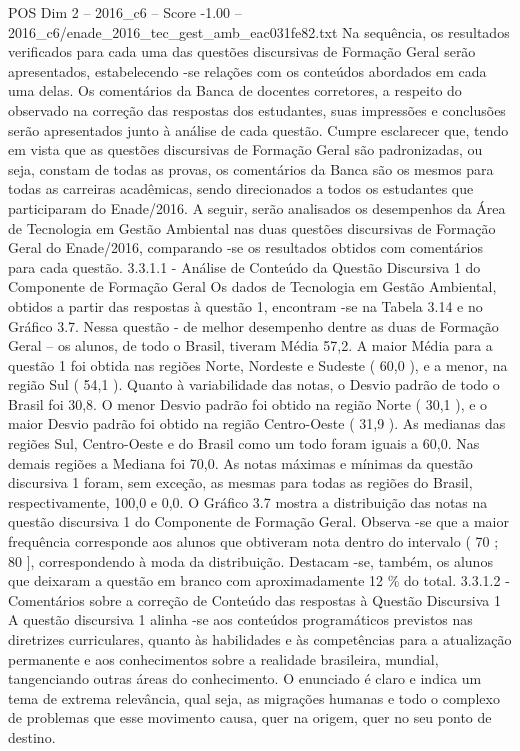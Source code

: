 \begin{textsample}{POS Dim 2 – 2016\_c6 – Score -1.00 – 2016\_c6/enade\_2016\_tec\_gest\_amb\_eac031fe82.txt}
Na sequência, os resultados verificados para cada uma das questões discursivas de Formação Geral serão apresentados, estabelecendo -se relações com os conteúdos abordados em cada uma delas.
Os comentários da Banca de docentes corretores, a respeito do observado na correção das respostas dos estudantes, suas impressões e conclusões serão apresentados junto à análise de cada questão.
Cumpre esclarecer que, tendo em vista que as questões discursivas de Formação Geral são padronizadas, ou seja, constam de todas as provas, os comentários da Banca são os mesmos para todas as carreiras acadêmicas, sendo direcionados a todos os estudantes que participaram do Enade/2016.
A seguir, serão analisados os desempenhos da Área de Tecnologia em Gestão Ambiental nas duas questões discursivas de Formação Geral do Enade/2016, comparando -se os resultados obtidos com comentários para cada questão. 3.3.1.1 - Análise de Conteúdo da Questão Discursiva 1 do Componente de Formação Geral Os dados de Tecnologia em Gestão Ambiental, obtidos a partir das respostas à questão 1, encontram -se na Tabela 3.14 e no Gráfico 3.7.
Nessa questão - de melhor desempenho dentre as duas de Formação Geral – os alunos, de todo o Brasil, tiveram Média 57,2.
A maior Média para a questão 1 foi obtida nas regiões Norte, Nordeste e Sudeste ( 60,0 ), e a menor, na região Sul ( 54,1 ).
Quanto à variabilidade das notas, o Desvio padrão de todo o Brasil foi 30,8.
O menor Desvio padrão foi obtido na região Norte ( 30,1 ), e o maior Desvio padrão foi obtido na região Centro-Oeste ( 31,9 ).
As medianas das regiões Sul, Centro-Oeste e do Brasil como um todo foram iguais a 60,0.
Nas demais regiões a Mediana foi 70,0.
As notas máximas e mínimas da questão discursiva 1 foram, sem exceção, as mesmas para todas as regiões do Brasil, respectivamente, 100,0 e 0,0.
O Gráfico 3.7 mostra a distribuição das notas na questão discursiva 1 do Componente de Formação Geral.
Observa -se que a maior frequência corresponde aos alunos que obtiveram nota dentro do intervalo ( 70 ; 80 ], correspondendo à moda da distribuição.
Destacam -se, também, os alunos que deixaram a questão em branco com aproximadamente 12 \% do total. 3.3.1.2 - Comentários sobre a correção de Conteúdo das respostas à Questão Discursiva 1 A questão discursiva 1 alinha -se aos conteúdos programáticos previstos nas diretrizes curriculares, quanto às habilidades e às competências para a atualização permanente e aos conhecimentos sobre a realidade brasileira, mundial, tangenciando outras áreas do conhecimento.
O enunciado é claro e indica um tema de extrema relevância, qual seja, as migrações humanas e todo o complexo de problemas que esse movimento causa, quer na origem, quer no seu ponto de destino.

\end{textsample}
